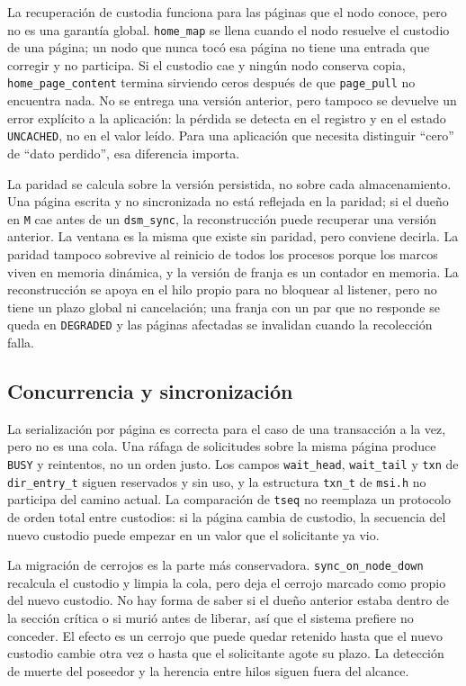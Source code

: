 \documentclass[11pt,spanish]{article}
\begin{document}
La recuperación de custodia funciona para las páginas que el nodo conoce, pero no es una garantía global. \texttt{home\_map} se llena cuando el nodo resuelve el custodio de una página; un nodo que nunca tocó esa página no tiene una entrada que corregir y no participa. Si el custodio cae y ningún nodo conserva copia, \texttt{home\_page\_content} termina sirviendo ceros después de que \texttt{page\_pull} no encuentra nada. No se entrega una versión anterior, pero tampoco se devuelve un error explícito a la aplicación: la pérdida se detecta en el registro y en el estado \texttt{UNCACHED}, no en el valor leído. Para una aplicación que necesita distinguir ``cero'' de ``dato perdido'', esa diferencia importa.

La paridad se calcula sobre la versión persistida, no sobre cada almacenamiento. Una página escrita y no sincronizada no está reflejada en la paridad; si el dueño en \texttt{M} cae antes de un \texttt{dsm\_sync}, la reconstrucción puede recuperar una versión anterior. La ventana es la misma que existe sin paridad, pero conviene decirla. La paridad tampoco sobrevive al reinicio de todos los procesos porque los marcos viven en memoria dinámica, y la versión de franja es un contador en memoria. La reconstrucción se apoya en el hilo propio para no bloquear al listener, pero no tiene un plazo global ni cancelación; una franja con un par que no responde se queda en \texttt{DEGRADED} y las páginas afectadas se invalidan cuando la recolección falla.

\subsection{Concurrencia y sincronización}

La serialización por página es correcta para el caso de una transacción a la vez, pero no es una cola. Una ráfaga de solicitudes sobre la misma página produce \texttt{BUSY} y reintentos, no un orden justo. Los campos \texttt{wait\_head}, \texttt{wait\_tail} y \texttt{txn} de \texttt{dir\_entry\_t} siguen reservados y sin uso, y la estructura \texttt{txn\_t} de \texttt{msi.h} no participa del camino actual. La comparación de \texttt{tseq} no reemplaza un protocolo de orden total entre custodios: si la página cambia de custodio, la secuencia del nuevo custodio puede empezar en un valor que el solicitante ya vio.

La migración de cerrojos es la parte más conservadora. \texttt{sync\_on\_node\_down} recalcula el custodio y limpia la cola, pero deja el cerrojo marcado como propio del nuevo custodio. No hay forma de saber si el dueño anterior estaba dentro de la sección crítica o si murió antes de liberar, así que el sistema prefiere no conceder. El efecto es un cerrojo que puede quedar retenido hasta que el nuevo custodio cambie otra vez o hasta que el solicitante agote su plazo. La detección de muerte del poseedor y la herencia entre hilos siguen fuera del alcance.
\end{document}
